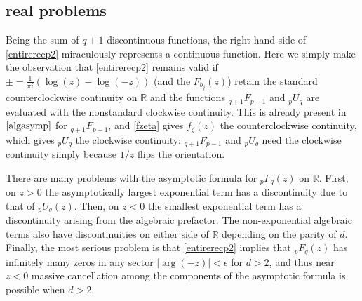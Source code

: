 \documentclass[12pt]{article}
\numberwithin{equation}{section}
\begin{document}
\subsection{real problems}
Being the sum of $q+1$ discontinuous functions, the right hand side of \eqref{entirerecp2} miraculously represents a continuous function. Here we simply make the observation that \eqref{entirerecp2} remains valid if $\pm = \tfrac{1}{\pi i}(\log(z)-\log(-z))$ (and the $F_{b_j}(z)$) retain the standard counterclockwise continuity on $\mathbb{R}$ and the functions ${}_{q+1}F_{p-1}$ and ${}_p U_{q}$ are evaluated with the nonstandard clockwise continuity. This is already present in $\eqref{algasymp}$ for ${}_{q+1}F_{p-1}^{-}$, and \eqref{fzeta} gives $f_{\zeta}(z)$ the counterclockwise continuity, which gives ${}_p U_q$ the clockwise continuity: ${}_{q+1}F_{p-1}$ and ${}_p U_{q}$ need the clockwise continuity simply because $1/z$ flips the orientation.

There are many problems with the asymptotic formula for ${}_p F_{q}(z)$ on $\mathbb{R}$. First, on $z>0$ the asymptotically largest exponential term has a discontinuity due to that of ${}_p U_{q}(z)$. Then, on $z<0$ the smallest exponential term has a discontinuity arising from the algebraic prefactor. The non-exponential algebraic terms also have discontinuities on either side of $\mathbb{R}$ depending on the parity of $d$. Finally, the most serious problem is that \eqref{entirerecp2} implies that ${}_p F_{q}(z)$ has infinitely many zeros in any sector $|\arg(-z)| < \epsilon$ for $d>2$, and thus near $z<0$ massive cancellation among the components of the asymptotic formula is possible when $d>2$.
\end{document}

